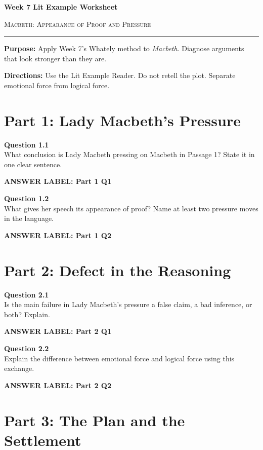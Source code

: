 \documentclass[12pt]{article}
\newcommand{\answerbox}[2]{%
\vspace{0.12em}
\noindent\textbf{#1}\par
\vspace{0.04em}
\noindent\fbox{%
\begin{minipage}[t][#2]{\dimexpr\textwidth-2\fboxsep-2\fboxrule}
\rule{\textwidth}{0pt}
\vspace{#2}
\end{minipage}}
\par\vspace{0.22em}}
\begin{document}
\begin{center}
{\LARGE\bfseries Week 7 Lit Example Worksheet}\par\vspace{0.05em}
{\large\scshape Macbeth: Appearance of Proof and Pressure}\par\vspace{0.12em}
\rule{0.78\textwidth}{0.5pt}
\end{center}

\textbf{Purpose:} Apply Week 7's Whately method to \textit{Macbeth}. Diagnose arguments that look stronger than they are.

\textbf{Directions:} Use the Lit Example Reader. Do not retell the plot. Separate emotional force from logical force.

\section*{Part 1: Lady Macbeth's Pressure}

\textbf{Question 1.1}\\[-0.15em]
What conclusion is Lady Macbeth pressing on Macbeth in Passage 1? State it in one clear sentence.

\answerbox{ANSWER LABEL: Part 1 Q1}{2.15in}

\textbf{Question 1.2}\\[-0.15em]
What gives her speech its appearance of proof? Name at least two pressure moves in the language.

\answerbox{ANSWER LABEL: Part 1 Q2}{2.35in}

\newpage

\section*{Part 2: Defect in the Reasoning}

\textbf{Question 2.1}\\[-0.15em]
Is the main failure in Lady Macbeth's pressure a false claim, a bad inference, or both? Explain.

\answerbox{ANSWER LABEL: Part 2 Q1}{2.45in}

\textbf{Question 2.2}\\[-0.15em]
Explain the difference between emotional force and logical force using this exchange.

\answerbox{ANSWER LABEL: Part 2 Q2}{2.35in}

\newpage

\section*{Part 3: The Plan and the Settlement}
\end{document}
